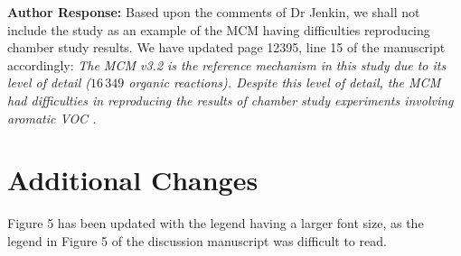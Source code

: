 \documentclass{article}
\begin{document}
\textbf{Author Response:} Based upon the comments of Dr Jenkin, we shall not include the \citet{Pinho:2005} study as an example of the MCM having difficulties reproducing chamber study results.
We have updated page 12395, line 15 of the manuscript accordingly: \textit{The MCM v3.2 is the reference mechanism in this study due to its level of detail ($16\,349$ organic reactions). Despite this level of detail, the MCM had difficulties in reproducing the results of chamber study experiments involving aromatic VOC \citep{Bloss:2005}.}

\section*{Additional Changes}

Figure 5 has been updated with the legend having a larger font size, as the legend in Figure 5 of the discussion manuscript was difficult to read.
\end{document}
